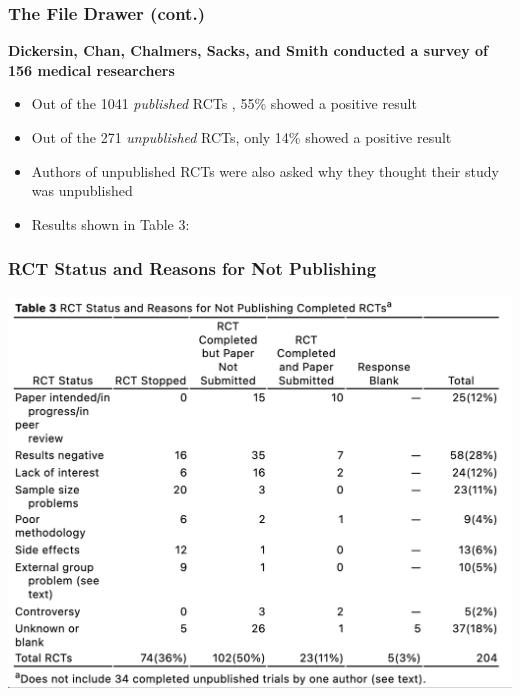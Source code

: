 \documentclass[10pt, block=fill]{beamer}
\begin{document}
\begin{frame}
    \frametitle{The File Drawer (cont.)}
    
    \textbf{Dickersin, Chan, Chalmers, Sacks, and Smith conducted a survey of 156 medical researchers}
    \begin{itemize}
        \item Out of the 1041 \textit{published} RCTs , 55\% showed a positive result
        \item Out of the 271 \textit{unpublished} RCTs, only 14\% showed a positive result
        \item Authors of unpublished RCTs were also asked why they thought their study was unpublished
        \item Results shown in Table 3:
    \end{itemize}
\end{frame}

\begin{frame}
    \frametitle{RCT Status and Reasons for Not Publishing}

    \begin{center}
        \includegraphics[width=0.9\linewidth]{figures/table_3.png}
    \end{center}
    
\end{frame}
\end{document}
